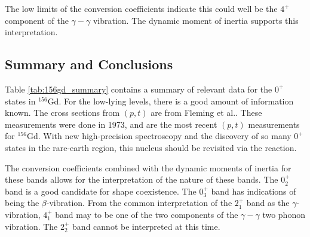 The low limits of the conversion coefficients indicate this could well be the $4^+$ component of the $\gamma-\gamma$ vibration. The dynamic moment of inertia supports this interpretation.





\subsection{Summary and Conclusions}

Table \ref{tab:156gd_summary} contains a summary of relevant data for the $0^+$ states in $^{156}$Gd. For the low-lying levels, there is a good amount of information known. The cross sections from $(p,t)$ are from Fleming et al.\citep{fleming73:_156gd}. These measurements were done in 1973, and are the most recent $(p,t)$ measurements for $^{156}$Gd. With new high-precision spectroscopy and the discovery of so many $0^+$ states in the rare-earth region, this nucleus should be revisited via the reaction.

The conversion coefficients combined with the dynamic moments of inertia for these bands allows for the interpretation of the nature of these bands. The $0^+_2$ band  is a good candidate for shape coexistence. The $0^+_3$ band has indications of being the $\beta$-vibration. From the common interpretation of the $2^+_1$ band as the $\gamma$-vibration,  $4^+_1$ band may to be one of the two components of the $\gamma-\gamma$ two phonon vibration. The $2^+_2$ band cannot be interpreted at this time.

